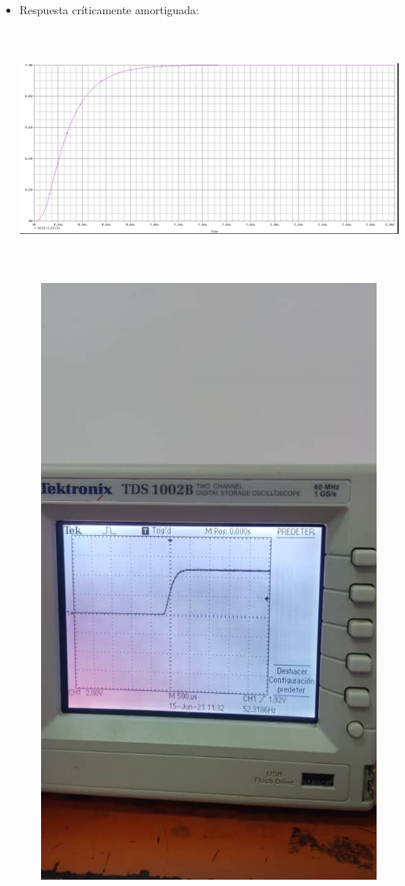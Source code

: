 \documentclass[12pt]{article}
\begin{document}
\begin{enumerate}
\begin{itemize}
    		\item Respuesta críticamente amortiguada:
    		
    		\begin{center}
    			\includegraphics[width=16cm,height=8cm]{Img/critamor}
    		\end{center}
    		
    		\begin{center}
    			\includegraphics[width=16cm,height=20cm]{Img/critamor_lab}
    		\end{center}
    		

\end{itemize}
\end{enumerate}
\end{document}

